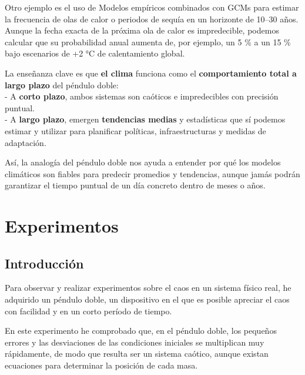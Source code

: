 \documentclass[
  10pt,
  a4paper,
  DIV=11,
  numbers=noendperiod,
  open=any]{scrreprt}
\numberwithin{equation}{chapter}
\numberwithin{equation}{section}
\renewcommand{\[}{\begin{equation}}
\renewcommand{\]}{\end{equation}}
\begin{document}
Otro ejemplo es el uso de Modelos empíricos combinados con GCMs para
estimar la frecuencia de olas de calor o periodos de sequía en un
horizonte de 10--30 años. Aunque la fecha exacta de la próxima ola de
calor es impredecible, podemos calcular que su probabilidad anual
aumenta de, por ejemplo, un 5 \% a un 15 \% bajo escenarios de +2 °C de
calentamiento global.

La enseñanza clave es que \textbf{el clima} funciona como el
\textbf{comportamiento total a largo plazo} del péndulo doble:\\
- A \textbf{corto plazo}, ambos sistemas son caóticos e impredecibles
con precisión puntual.\\
- A \textbf{largo plazo}, emergen \textbf{tendencias medias} y
estadísticas que sí podemos estimar y utilizar para planificar
políticas, infraestructuras y medidas de adaptación.

Así, la analogía del péndulo doble nos ayuda a entender por qué los
modelos climáticos son fiables para predecir promedios y tendencias,
aunque jamás podrán garantizar el tiempo puntual de un día concreto
dentro de meses o años.

\chapter{Experimentos}\label{experimentos}

\section{Introducción}\label{introducciuxf3n-4}

Para observar y realizar experimentos sobre el caos en un sistema físico
real, he adquirido un péndulo doble, un dispositivo en el que es posible
apreciar el caos con facilidad y en un corto período de tiempo.

En este experimento he comprobado que, en el péndulo doble, los pequeños
errores y las desviaciones de las condiciones iniciales se multiplican
muy rápidamente, de modo que resulta ser un sistema caótico, aunque existan ecuaciones para determinar la posición de cada masa. 
\end{document}
